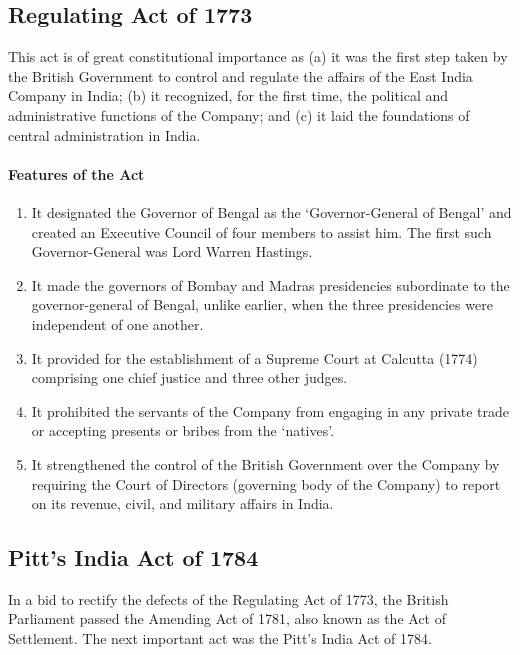 \begin{multicols}{2}
\subsection{Regulating Act of 1773}
This act is of great constitutional importance as (a) it was the first step taken by the British Government to control and regulate the affairs of the East India Company in India; (b) it recognized, for the first time, the political and administrative functions of the Company; and (c) it laid the foundations of central administration in India.

\paragraph{Features of the Act}

\begin{enumerate}
  \item It designated the Governor of Bengal as the `Governor-General of Bengal' and created an Executive Council of four members to assist him. The first such Governor-General was Lord Warren Hastings.
  \item It made the governors of Bombay and Madras presidencies subordinate to the governor-general of Bengal, unlike earlier, when the three presidencies were independent of one another.
  \item It provided for the establishment of a Supreme Court at Calcutta (1774) comprising one chief justice and three other judges.
  \item It prohibited the servants of the Company from engaging in any private trade or accepting presents or bribes from the `natives'.
  \item It strengthened the control of the British Government over the Company by requiring the Court of Directors (governing body of the Company) to report on its revenue, civil, and military affairs in India.
\end{enumerate}

\subsection{Pitt's India Act of 1784}
In a bid to rectify the defects of the Regulating Act of 1773, the British Parliament passed the Amending Act of 1781, also known as the Act of Settlement. The next important act was the Pitt's India Act of 1784.


\end{multicols}
